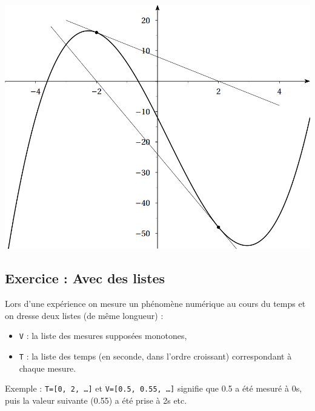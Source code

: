 \documentclass[10pt,oneside]{article}
\begin{document}
\begin{center}
\includegraphics[width=.5\textwidth]{images/fig2}
\end{center}


\subsection*{Exercice : Avec des listes}
\setcounter{subparagraph}{0}

Lors d'une expérience on mesure un phénomène numérique au cours du temps et on dresse deux listes (de même longueur) :
\begin{itemize}
\item \texttt{V} : la liste des mesures supposées monotones, 
\item \texttt{T} : la liste des temps (en seconde, dans l'ordre croissant) correspondant à chaque mesure.
\end{itemize}
Exemple : \texttt{T=[0, 2, \ldots]} et \texttt{V=[0.5, 0.55, \ldots]} signifie que 0.5 a été mesuré à 0s, puis la valeur suivante  (0.55) a été prise à 2s etc.
\end{document}
